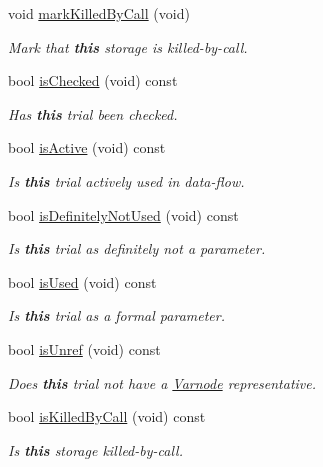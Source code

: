 \begin{DoxyCompactItemize}
void \mbox{\hyperlink{class_param_trial_a8b08e858cac5d750f527a673be97e322}{mark\+Killed\+By\+Call}} (void)
\begin{DoxyCompactList}\small\item\em Mark that {\bfseries{this}} storage is {\itshape killed-\/by-\/call}. \end{DoxyCompactList}\item 
bool \mbox{\hyperlink{class_param_trial_a4ed0aada38fe913da929f7d29e47e61c}{is\+Checked}} (void) const
\begin{DoxyCompactList}\small\item\em Has {\bfseries{this}} trial been checked. \end{DoxyCompactList}\item 
bool \mbox{\hyperlink{class_param_trial_a2b98b8c531ad081df9e4eb703ece9dc3}{is\+Active}} (void) const
\begin{DoxyCompactList}\small\item\em Is {\bfseries{this}} trial actively used in data-\/flow. \end{DoxyCompactList}\item 
bool \mbox{\hyperlink{class_param_trial_a55ddad64a188a6513272a284098aea23}{is\+Definitely\+Not\+Used}} (void) const
\begin{DoxyCompactList}\small\item\em Is {\bfseries{this}} trial as definitely not a parameter. \end{DoxyCompactList}\item 
bool \mbox{\hyperlink{class_param_trial_a77ad2e667e0525e2417845e389dcfa9f}{is\+Used}} (void) const
\begin{DoxyCompactList}\small\item\em Is {\bfseries{this}} trial as a formal parameter. \end{DoxyCompactList}\item 
bool \mbox{\hyperlink{class_param_trial_a13bb1c434cce645e25a0a26359d6c889}{is\+Unref}} (void) const
\begin{DoxyCompactList}\small\item\em Does {\bfseries{this}} trial not have a \mbox{\hyperlink{class_varnode}{Varnode}} representative. \end{DoxyCompactList}\item 
bool \mbox{\hyperlink{class_param_trial_af67e7b4a445f7069a2680c63afe0a28c}{is\+Killed\+By\+Call}} (void) const
\begin{DoxyCompactList}\small\item\em Is {\bfseries{this}} storage {\itshape killed-\/by-\/call}. \end{DoxyCompactList}\item 

\end{DoxyCompactItemize}
